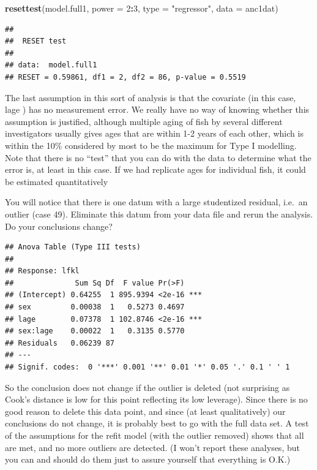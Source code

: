 \documentclass[
  12pt,
]{book}
\makeatletter
\newenvironment{Shaded}{\begin{snugshade}}{\end{snugshade}}
\newcommand{\DataTypeTok}[1]{\textcolor[rgb]{0.13,0.29,0.53}{#1}}
\newcommand{\DecValTok}[1]{\textcolor[rgb]{0.00,0.00,0.81}{#1}}
\newcommand{\KeywordTok}[1]{\textcolor[rgb]{0.13,0.29,0.53}{\textbf{#1}}}
\newcommand{\NormalTok}[1]{#1}
\newcommand{\OperatorTok}[1]{\textcolor[rgb]{0.81,0.36,0.00}{\textbf{#1}}}
\newcommand{\StringTok}[1]{\textcolor[rgb]{0.31,0.60,0.02}{#1}}
\newenvironment{kframe}{%
\medskip{}
\setlength{\fboxsep}{.8em}
\def\at@end@of@kframe{}%
\ifinner\ifhmode%
 \def\at@end@of@kframe{\end{minipage}}%
 \begin{minipage}{\columnwidth}%
\fi\fi%
\def\FrameCommand##1{\hskip\@totalleftmargin \hskip-\fboxsep
\colorbox{incolor}{##1}\hskip-\fboxsep
    \hskip-\linewidth \hskip-\@totalleftmargin \hskip\columnwidth}%
\MakeFramed {\advance\hsize-\width
  \@totalleftmargin\z@ \linewidth\hsize
  \@setminipage}}%
{\par\unskip\endMakeFramed%
\at@end@of@kframe}
\newenvironment{rmdblock}[1]
 {
 \begin{itemize}
 \renewcommand{\labelitemi}{
   \raisebox{-.7\height}[0pt][0pt]{
     {\setkeys{Gin}{width=3em,keepaspectratio}\texttt{[image: images/\#1]}}
   }
 }
 \begin{kframe}
 \setlength{\fboxsep}{1em}
 \item
 }
 {
 \end{kframe}
 \end{itemize}
 }
\newenvironment{rmdcode}
  {\begin{rmdblock}{screen}}
  {\end{rmdblock}}
\makeatother
\begin{document}
\begin{Shaded}
\begin{Highlighting}[]
\KeywordTok{resettest}\NormalTok{(model.full1, }\DataTypeTok{power =} \DecValTok{2}\OperatorTok{:}\DecValTok{3}\NormalTok{, }\DataTypeTok{type =} \StringTok{"regressor"}\NormalTok{, }\DataTypeTok{data =}\NormalTok{ anc1dat)}
\end{Highlighting}
\end{Shaded}

\begin{verbatim}
## 
##  RESET test
## 
## data:  model.full1
## RESET = 0.59861, df1 = 2, df2 = 86, p-value = 0.5519
\end{verbatim}

The last assumption in this sort of analysis is that the covariate (in this case, lage ) has no measurement error. We really have no way of knowing whether this assumption is justified, although multiple aging of fish by several different investigators usually gives ages that are within 1-2 years of each other, which is within the 10\% considered by most to be the maximum for Type I modelling. Note that there is no ``test'' that you can do with the data to determine what the error is, at least in this case. If we had replicate ages for individual fish, it could be estimated quantitatively

\begin{rmdcode}
You will notice that there is one datum with a large studentized residual, i.e.~an outlier (case 49). Eliminate this datum from your data file and rerun the analysis. Do your conclusions change?
\end{rmdcode}

\begin{verbatim}
## Anova Table (Type III tests)
## 
## Response: lfkl
##              Sum Sq Df  F value Pr(>F)    
## (Intercept) 0.64255  1 895.9394 <2e-16 ***
## sex         0.00038  1   0.5273 0.4697    
## lage        0.07378  1 102.8746 <2e-16 ***
## sex:lage    0.00022  1   0.3135 0.5770    
## Residuals   0.06239 87                    
## ---
## Signif. codes:  0 '***' 0.001 '**' 0.01 '*' 0.05 '.' 0.1 ' ' 1
\end{verbatim}

So the conclusion does not change if the outlier is deleted (not surprising as Cook's distance is low for this point reflecting its low leverage). Since there is no good reason to delete this data point, and since (at least qualitatively) our conclusions do not change, it is probably best to go with the full data set. A test of the assumptions for the refit model (with the outlier removed) shows that all are met, and no more outliers are detected. (I won't report these analyses, but you can and should do them just to assure yourself that everything is O.K.)
\end{document}
